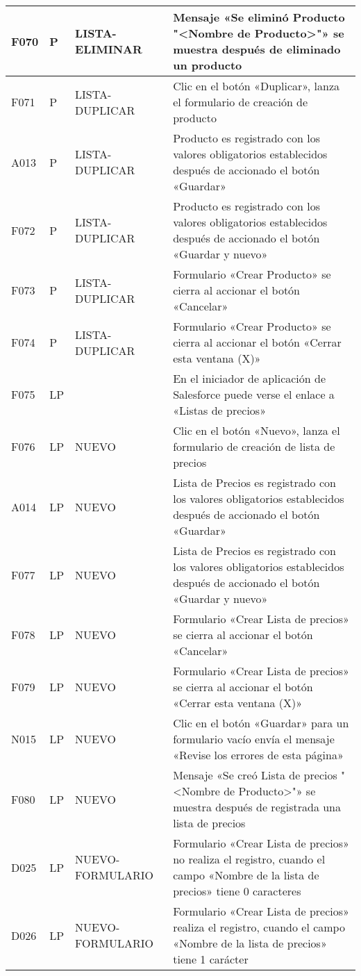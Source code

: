 \begin{landscape}
\begin{longtable}[htb]{|l|l|p{5.0cm}|p{13.0cm}|}
F070 & P & LISTA-ELIMINAR & Mensaje «Se eliminó Producto "<Nombre de Producto>"» se muestra después de eliminado un producto \\ \hline
F071 & P & LISTA-DUPLICAR & Clic en el botón «Duplicar», lanza el formulario de creación de producto \\ \hline
A013 & P & LISTA-DUPLICAR & Producto es registrado con los valores obligatorios establecidos después de accionado el botón «Guardar» \\ \hline
F072 & P & LISTA-DUPLICAR & Producto es registrado con los valores obligatorios establecidos después de accionado el botón «Guardar y nuevo» \\ \hline
F073 & P & LISTA-DUPLICAR & Formulario «Crear Producto» se cierra al accionar el botón «Cancelar» \\ \hline
F074 & P & LISTA-DUPLICAR & Formulario «Crear Producto» se cierra al accionar el botón «Cerrar esta ventana (X)» \\ \hline
F075 & LP &  & En el iniciador de aplicación de Salesforce puede verse el enlace a «Listas de precios» \\ \hline
F076 & LP & NUEVO & Clic en el botón «Nuevo», lanza el formulario de creación de lista de precios \\ \hline
A014 & LP & NUEVO & Lista de Precios es registrado con los valores obligatorios establecidos después de accionado el botón «Guardar» \\ \hline
F077 & LP & NUEVO & Lista de Precios es registrado con los valores obligatorios establecidos después de accionado el botón «Guardar y nuevo» \\ \hline
F078 & LP & NUEVO & Formulario «Crear Lista de precios» se cierra al accionar el botón «Cancelar» \\ \hline
F079 & LP & NUEVO & Formulario «Crear Lista de precios» se cierra al accionar el botón «Cerrar esta ventana (X)» \\ \hline
N015 & LP & NUEVO & Clic en el botón «Guardar» para un formulario vacío envía el mensaje «Revise los errores de esta página» \\ \hline
F080 & LP & NUEVO & Mensaje «Se creó Lista de precios "<Nombre de Producto>"» se muestra después de registrada una lista de precios \\ \hline
D025 & LP & NUEVO-FORMULARIO & Formulario «Crear Lista de precios» no realiza el registro, cuando el campo «Nombre de la lista de precios» tiene 0 caracteres \\ \hline
D026 & LP & NUEVO-FORMULARIO & Formulario «Crear Lista de precios» realiza el registro, cuando el campo «Nombre de la lista de precios» tiene 1 carácter \\ \hline

\end{longtable}
\end{landscape}
